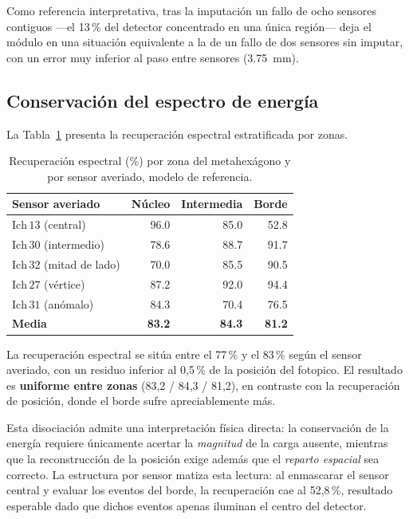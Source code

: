 Como referencia interpretativa, tras la imputación un fallo de ocho sensores contiguos ---el 13\,\%
del detector concentrado en una única región--- deja el módulo en una situación equivalente a la de
un fallo de dos sensores sin imputar, con un error muy inferior al paso entre sensores
(\SI{3.75}{\milli\metre}).

\subsection{Conservación del espectro de energía}
\label{subsec:res-espectro}

La Tabla~\ref{tab:res-espectro} presenta la recuperación espectral estratificada por zonas.

\begin{table}[htbp]
\centering
\caption{Recuperación espectral (\%) por zona del metahexágono y por sensor averiado,
modelo de referencia.}
\label{tab:res-espectro}
\begin{tabular}{lrrr}
\toprule
\textbf{Sensor averiado} & \textbf{Núcleo} & \textbf{Intermedia} & \textbf{Borde} \\
\midrule
$\mathrm{Ich}\,13$ (central) & 96.0 & 85.0 & 52.8 \\
$\mathrm{Ich}\,30$ (intermedio) & 78.6 & 88.7 & 91.7 \\
$\mathrm{Ich}\,32$ (mitad de lado) & 70.0 & 85.5 & 90.5 \\
$\mathrm{Ich}\,27$ (vértice) & 87.2 & 92.0 & 94.4 \\
$\mathrm{Ich}\,31$ (anómalo) & 84.3 & 70.4 & 76.5 \\
\midrule
\textbf{Media} & \textbf{83.2} & \textbf{84.3} & \textbf{81.2} \\
\bottomrule
\end{tabular}
\end{table}

La recuperación espectral se sitúa entre el 77\,\% y el 83\,\% según el sensor averiado, con un
residuo inferior al 0,5\,\% de la posición del fotopico. El resultado es \textbf{uniforme entre
zonas} (83,2 / 84,3 / 81,2), en contraste con la recuperación de posición, donde el borde sufre
apreciablemente más.

Esta disociación admite una interpretación física directa: la conservación de la energía requiere
únicamente acertar la \emph{magnitud} de la carga ausente, mientras que la reconstrucción de la
posición exige además que el \emph{reparto espacial} sea correcto. La estructura por sensor matiza
esta lectura: al enmascarar el sensor central y evaluar los eventos del borde, la recuperación cae
al 52,8\,\%, resultado esperable dado que dichos eventos apenas iluminan el centro del detector.

